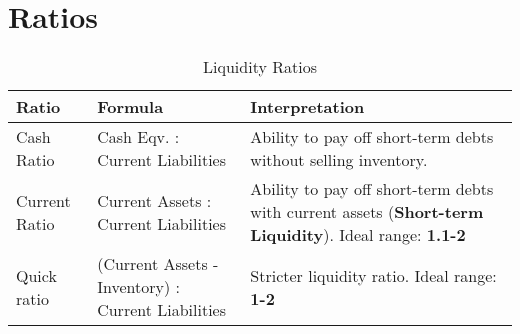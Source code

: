 \section{Ratios}
\label{sec:ratios}

\begin{table}[h]
    \centering
    \caption{Liquidity Ratios}
    \label{tab:liquidity_ratios}
    \begin{tabular}{|p{}|p{}|p{}|}
        \hline
        \textbf{Ratio}                          & \textbf{Formula}                                   & \textbf{Interpretation}                                                                                              \\
        \hline
        Cash Ratio \label{def:cash_ratio}       & Cash Eqv. : Current Liabilities                    & Ability to pay off short-term debts without selling inventory.                                                       \\
        \hline
        Current Ratio \label{def:current_ratio} & Current Assets : Current Liabilities               & Ability to pay off short-term debts with current assets (\textbf{Short-term Liquidity}). Ideal range: \textbf{1.1-2} \\
        \hline
        Quick ratio                             & (Current Assets - Inventory) : Current Liabilities & Stricter liquidity ratio. Ideal range: \textbf{1-2}                                                                  \\
        \hline
    \end{tabular}
\end{table}

